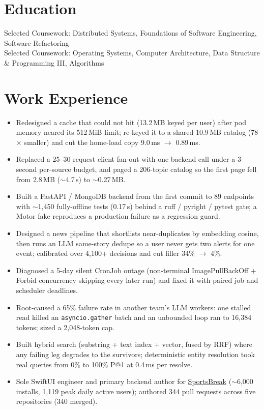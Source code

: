 \documentclass[11pt, letterpaper]{article}
\begin{document}

\section{Education}
Selected Coursework: Distributed Systems, Foundations of Software Engineering, Software Refactoring\\[1pt]
Selected Coursework: Operating Systems, Computer Architecture, Data Structure \& Programming III, Algorithms

\section{Work Experience}
\begin{itemize}
  \item Redesigned a cache that could not hit (13.2\,MB keyed per user) after pod memory neared its 512\,MiB limit; re-keyed it to a shared 10.9\,MB catalog (78$\times$ smaller) and cut the home-load copy 9.0\,ms $\to$ 0.89\,ms.
  \item Replaced a 25--30 request client fan-out with one backend call under a 3-second per-source budget, and paged a 206-topic catalog so the first page fell from 2.8\,MB ($\sim$4.7\,s) to $\sim$0.27\,MB.
  \item Built a FastAPI / MongoDB backend from the first commit to 89 endpoints with $\sim$1{,}450 fully-offline tests (0.17\,s) behind a ruff / pyright / pytest gate; a Motor fake reproduces a production failure as a regression guard.
  \item Designed a news pipeline that shortlists near-duplicates by embedding cosine, then runs an LLM same-story dedupe so a user never gets two alerts for one event; calibrated over 4{,}100+ decisions and cut filler 34\% $\to$ 4\%.
  \item Diagnosed a 5-day silent CronJob outage (non-terminal ImagePullBackOff + Forbid concurrency skipping every later run) and fixed it with paired job and scheduler deadlines.
  \item Root-caused a 65\% failure rate in another team's LLM workers: one stalled read killed an \texttt{asyncio.gather} batch and an unbounded loop ran to 16{,}384 tokens; sized a 2{,}048-token cap.
  \item Built hybrid search (substring + text index + vector, fused by RRF) where any failing leg degrades to the survivors; deterministic entity resolution took real queries from 0\% to 100\% P@1 at 0.4\,ms per resolve.
  \item Sole SwiftUI engineer and primary backend author for \href{https://apps.apple.com/app/id6762649287}{SportsBreak} ($\sim$6{,}000 installs, 1{,}119 peak daily active users); authored 344 pull requests across five repositories (340 merged).
\end{itemize}
\end{document}
